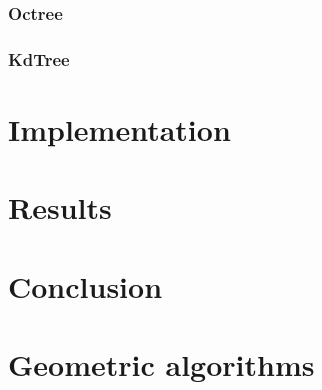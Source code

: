 \documentclass[a4paper,10pt,abstracton,notitlepage]{scrreprt}
\begin{document}
\subsection{Octree}
\subsection{KdTree}

\chapter{Implementation}

\chapter{Results}

\chapter{Conclusion}

\appendix
\chapter{Geometric algorithms}
\end{document}
